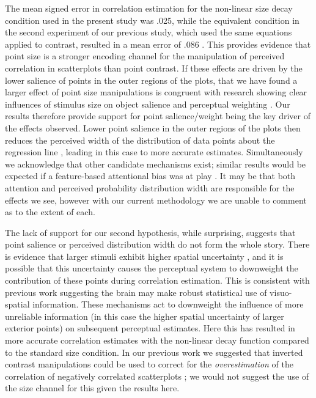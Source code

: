 \documentclass{vgtc}                          %
\begin{document}
The mean signed error in correlation estimation for the non-linear size decay condition used
in the present study was .025, while the equivalent condition in the second experiment
of our previous study, which used the same equations applied to contrast, resulted
in a mean error of .086 \cite{strain_2023}. This provides evidence that point
size is a stronger encoding channel for the manipulation of perceived correlation in
scatterplots than point contrast. If these effects are driven by the lower salience of
points in the outer regions of the plots,
that we have found a larger effect of point size manipulations is congruent
with research showing clear influences of stimulus size on object salience and
perceptual weighting \cite{grice_1983, healey_2012, hong_2021}. Our results
therefore provide support for point salience/weight being the key driver of
the effects observed. Lower point salience in the outer regions of the plots
then reduces the perceived width of the distribution of data points about
the regression line \cite{meyer_1997, rensink_2017}, leading in this case to more
accurate estimates. Simultaneously we acknowledge
that other candidate mechanisms exist; similar results would be expected if a
feature-based attentional bias was at play \cite{hong_2021, sun_2016}.
It may be that both attention and perceived probability distribution width
are responsible for the effects we see, however with our current methodology
we are unable to comment as to the extent of each.

The lack of support for our second hypothesis, while surprising, suggests that
point salience or perceived distribution width do not form the whole story. There is
evidence that larger stimuli exhibit higher spatial uncertainty \cite{alais_2004},
and it is possible that this uncertainty causes the perceptual system to downweight
the contribution of these points during correlation estimation. This is consistent
with previous work \cite{warren_2002, warren_2004} suggesting the brain may make
robust statistical use of visuo-spatial information. These mechanisms act to
downweight the influence of more unreliable information (in this case the higher
spatial uncertainty of larger exterior points) on subsequent perceptual estimates. Here this
has resulted in more accurate correlation estimates with the non-linear decay function compared
to the standard size condition. In our previous work we suggested that inverted contrast
manipulations could be used to correct for the \emph{overestimation} of the correlation
of negatively correlated scatterplots \cite{sher_2017}; we would not
suggest the use of the size channel for this given the results here.
\end{document}

